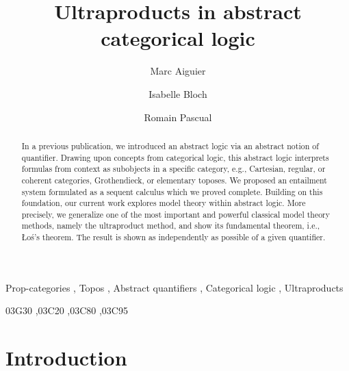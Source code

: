 \documentclass[preprint,3p,times]{elsarticle}
\newcommand{\Los}{\L{}o{\'s}}
\begin{document}
\begin{frontmatter}

\title{Ultraproducts in abstract categorical logic}

\author[mics]{Marc Aiguier}
\author[lip6]{Isabelle Bloch}
\author[mics,kit]{Romain Pascual}

\begin{abstract}
In a previous publication, we introduced an abstract logic via an abstract notion of quantifier. Drawing upon concepts from categorical logic, this abstract logic interprets formulas from context as subobjects in a specific category, e.g., Cartesian, regular, or coherent categories, Grothendieck, or elementary toposes. We proposed an entailment system formulated as a sequent calculus which we proved complete. Building on this foundation, our current work explores model theory within abstract logic. More precisely, we generalize one of the most important and powerful classical model theory methods, namely the ultraproduct method, and show its fundamental theorem, i.e., \Los's theorem. The result is shown as independently as possible of a given quantifier.
\end{abstract}

\begin{keyword}
	Prop-categories \sep
	Topos \sep 
	Abstract quantifiers \sep
	Categorical logic \sep
	Ultraproducts

    \MSC[2020] 03G30 %
    \sep 03C20 %
    \sep 03C80 %
    \sep 03C95 %
\end{keyword}
\end{frontmatter}

\tableofcontents

\section{Introduction}
\end{document}
